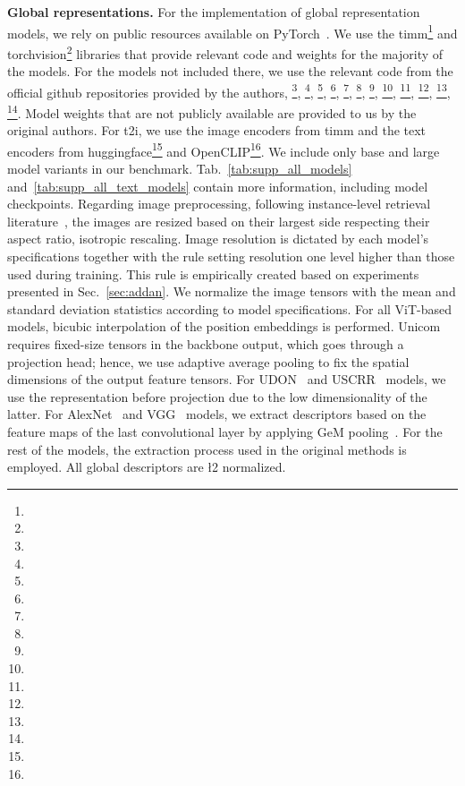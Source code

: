 \medskip\noindent\textbf{Global representations.}
For the implementation of global representation models, we rely on public resources available on PyTorch~\cite{pgm+19}. We use the timm\footnote{} and torchvision\footnote{} libraries that provide relevant code and weights for the majority of the models. For the models not included there, we use the relevant code from the official github repositories provided by the authors, \ie
\cite{odm+24}\footnote{},
\cite{ctm+21}\footnote{},
\cite{cmm+20}\footnote{},
\cite{hfw+20}\footnote{},
\cite{ptm+22}\footnote{},
\cite{kjk23}\footnote{},
\cite{lsl+22}\footnote{},
\cite{sck+23}\footnote{},
\cite{ady+23}\footnote{},
\cite{swl+24}\footnote{},
\cite{ycc+23}\footnote{},
\cite{yca+24}\footnote{}. Model weights that are not publicly available are provided to us by the original authors. 
For t2i, we use the image encoders from timm and the text encoders from huggingface\footnote{} and OpenCLIP\footnote{}. We include only base and large model variants in our benchmark. Tab.~\ref{tab:supp_all_models} and~\ref{tab:supp_all_text_models} contain more information, including model checkpoints. Regarding image preprocessing, following instance-level retrieval literature~\cite{sck+23,rtc19,lsl+22}, the images are resized based on their largest side respecting their aspect ratio, \ie isotropic rescaling. Image resolution is dictated by each model's specifications together with the rule setting resolution one level higher than those used during training. This rule is empirically created based on experiments presented in Sec.~\ref{sec:addan}. We normalize the image tensors with the mean and standard deviation statistics according to model specifications. For all ViT-based models, bicubic interpolation of the position embeddings is performed. Unicom~\cite{ady+23} requires fixed-size tensors in the backbone output, which goes through a projection head; hence, we use adaptive average pooling to fix the spatial dimensions of the output feature tensors. For UDON~\cite{yca+24} and USCRR~\cite{ycc+23} models, we use the representation before projection due to the low dimensionality of the latter. For AlexNet~\cite{ksh12} and VGG~\cite{sz14} models, we extract descriptors based on the feature maps of the last convolutional layer by applying GeM pooling~\cite{rtc19}. For the rest of the models, the extraction process used in the original methods is employed. All global descriptors are \l2 normalized.

